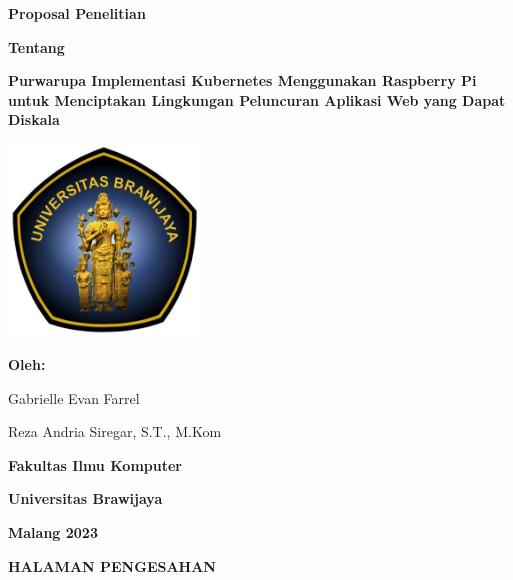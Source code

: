 \documentclass[a4paper,12pt]{article}
\begin{document}
\begin{titlepage}
\begin{center}
\textbf{\huge Proposal Penelitian}\vspace{1cm}

\textbf{\Large Tentang}\vspace{1cm}

\textbf{\LARGE Purwarupa Implementasi Kubernetes Menggunakan Raspberry Pi untuk Menciptakan Lingkungan Peluncuran Aplikasi Web yang Dapat Diskala}\vspace{3cm}

\includegraphics[width=2in]{pictures/cover_ub.png}\vspace{3cm}

\textbf{\large Oleh:}\vspace{0.5cm}

Gabrielle Evan Farrel\vspace{0.25cm}

Reza Andria Siregar, S.T., M.Kom\vspace{1cm}

\textbf{\Large Fakultas Ilmu Komputer}

\textbf{\Large Universitas Brawijaya}

\textbf{\Large Malang 2023}
\end{center}
\end{titlepage}

\begin{center}
{\Large \textbf{HALAMAN PENGESAHAN}}
\end{center}
\end{document}
